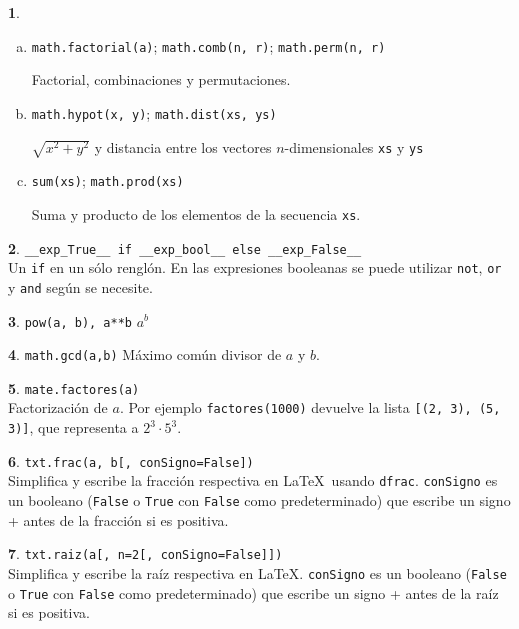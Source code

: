 \documentclass[12pt]{article}
\theoremstyle{definition}
\newtheorem{funcion}{}[section]
\begin{document}
\begin{funcion}
\begin{enumerate}[a)]
    \item \verb|math.factorial(a)|; \verb|math.comb(n, r)|; \verb|math.perm(n, r)|

      Factorial, combinaciones y permutaciones.

    \item \verb|math.hypot(x, y)|; \verb|math.dist(xs, ys)|

      $\sqrt{x^2+y^2}$ y distancia entre los vectores $n$-dimensionales  \verb|xs| y \verb|ys|

    \item \verb|sum(xs)|; \verb|math.prod(xs)|

      Suma y producto de los elementos de la secuencia \verb|xs|.

  \end{enumerate}
\end{funcion}

\begin{funcion} \verb|__exp_True__ if __exp_bool__ else __exp_False__| \\[1ex]
  Un \verb|if| en un s\'olo rengl\'on. En las expresiones booleanas se puede utilizar \verb|not|, \verb|or| y \verb|and| seg\'un se necesite.
\end{funcion}

\begin{funcion}
  \verb|pow(a, b), a**b| \quad
  $a^b$
\end{funcion}

\begin{funcion}
  \verb|math.gcd(a,b)| \quad
  M\'aximo com\'un divisor de $a$ y $b$.
\end{funcion}

\begin{funcion}
  \verb|mate.factores(a)| \\[1ex]
  Factorizaci\'on de $a$. Por ejemplo \verb|factores(1000)| devuelve la lista \verb|[(2, 3), (5, 3)]|, que representa a $2^3\cdot 5^3$.
\end{funcion}

\begin{funcion}
  \verb|txt.frac(a, b[, conSigno=False])| \\[1ex]
  Simplifica y escribe la fracci\'on respectiva en \LaTeX\ usando \verb|dfrac|. \verb|conSigno| es un booleano (\verb|False| o \verb|True| con \verb|False| como predeterminado) que escribe un signo + antes de la fracci\'on si es positiva.
\end{funcion}

\begin{funcion}
  \verb|txt.raiz(a[, n=2[, conSigno=False]])| \\[1ex]
  Simplifica y escribe la ra\'iz respectiva en \LaTeX. \verb|conSigno| es un booleano (\verb|False| o \verb|True| con \verb|False| como predeterminado) que escribe un signo + antes de la ra\'iz si es positiva.
\end{funcion}
\end{document}
